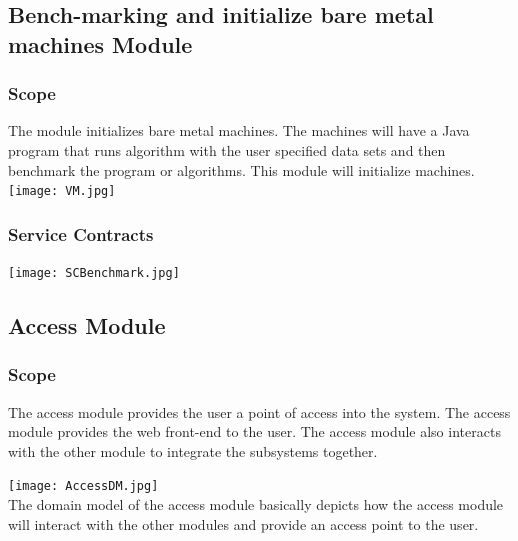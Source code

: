 \documentclass[runningheads,a4paper]{article}
\begin{document}
\subsection{Bench-marking and initialize bare metal machines Module}
\subsubsection{\textbf{Scope}}

The module initializes bare metal machines. The machines will have a Java program that runs algorithm with the user specified data sets and then benchmark the program or algorithms. This module will initialize machines.\\

\texttt{[image: VM.jpg]}  \\
\subsubsection{\textbf{Service Contracts}}
\texttt{[image: SCBenchmark.jpg]}  \\


\subsection{Access Module}\newline
\subsubsection{\textbf{Scope}}
The access module provides the user a point of access into the system. The access module provides the web front-end to the user. The access module also interacts with the other module to integrate the subsystems together. 

\texttt{[image: AccessDM.jpg]}  \\
The domain model of the access module basically depicts how the access module will interact with the other modules and provide an access point to the user.
\end{document}
